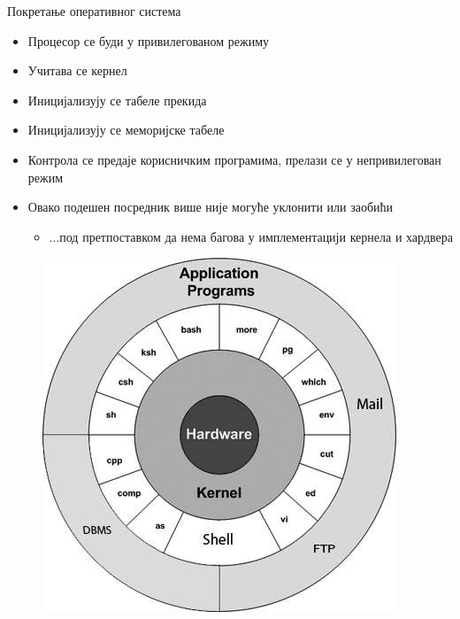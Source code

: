 \documentclass[xcolor=table]{beamer}
\begin{document}
    \begin{frame}[allowframebreaks]{Покретање оперативног система}
        \begin{itemize}
            \item Процесор се буди у привилегованом режиму
            \item Учитава се кернел
            \item Иницијализују се табеле прекида
            \item Иницијализују се меморијске табеле
            \item Контрола се предаје корисничким програмима, прелази се у непривилегован режим
            \item Овако подешен посредник више није могуће уклонити или заобићи
            \begin{itemize}
                \item ...под претпоставком да нема багова у имплементацији кернела и хардвера
            \end{itemize}
        \end{itemize}
        
        \framebreak
        
        \begin{figure}
            \centering
            \includegraphics[width=\textwidth,height=0.8\textheight,keepaspectratio]{images/unix_architecture.jpg}
            \label{fig:unix_architecture.jpg}
        \end{figure}
    \end{frame}
    
\end{document}
